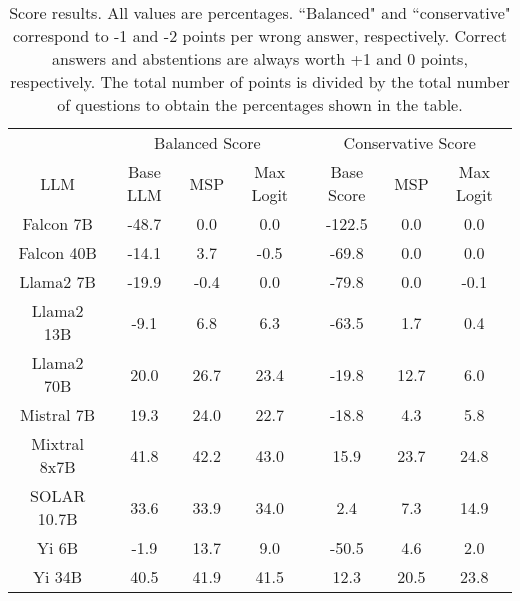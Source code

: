 \renewcommand\arraystretch{1.2}
\begin{table*}
\centering
\begin{tabular}{c|c|c|c|c|c|c}
& \multicolumn{3}{c|}{Balanced Score} & \multicolumn{3}{c}{Conservative Score} \\ 
LLM & Base LLM & MSP & Max Logit & Base Score & MSP & Max Logit\\ \hline
Falcon 7B & -48.7 & 0.0 & 0.0 & -122.5 & 0.0 & 0.0\\
Falcon 40B & -14.1 & 3.7 & -0.5 & -69.8 & 0.0 & 0.0\\
Llama2 7B & -19.9 & -0.4 & 0.0 & -79.8 & 0.0 & -0.1\\
Llama2 13B & -9.1 & 6.8 & 6.3 & -63.5 & 1.7 & 0.4\\
Llama2 70B & 20.0 & 26.7 & 23.4 & -19.8 & 12.7 & 6.0\\
Mistral 7B & 19.3 & 24.0 & 22.7 & -18.8 & 4.3 & 5.8\\
Mixtral 8x7B & 41.8 & 42.2 & 43.0 & 15.9 & 23.7 & 24.8\\
SOLAR 10.7B & 33.6 & 33.9 & 34.0 & 2.4 & 7.3 & 14.9\\
Yi 6B & -1.9 & 13.7 & 9.0 & -50.5 & 4.6 & 2.0\\
Yi 34B & 40.5 & 41.9 & 41.5 & 12.3 & 20.5 & 23.8\\
\hline
\end{tabular}
\caption{Score results. All values are percentages. ``Balanced" and ``conservative" correspond to -1 and -2 points per wrong answer, respectively. Correct answers and abstentions are always worth +1 and 0 points, respectively. The total number of points is divided by the total number of questions to obtain the percentages shown in the table.}
\label{tab:score}
\end{table*}

